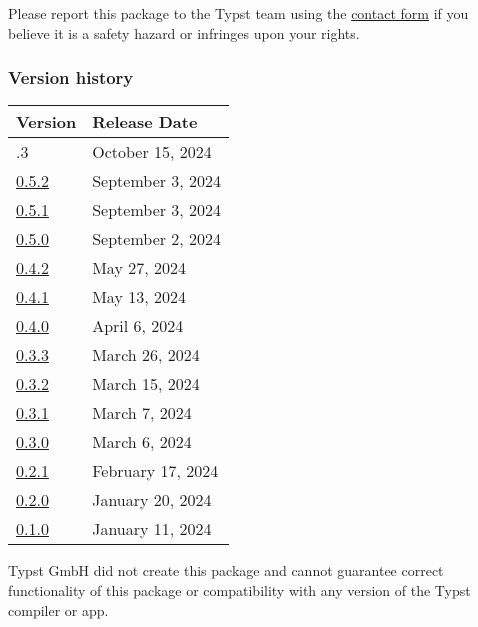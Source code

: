 Please report this package to the Typst team using the
\href{https://typst.app/contact}{contact form} if you believe it is a
safety hazard or infringes upon your rights.

\label{versions}
\subsubsection{Version history}\label{version-history}

\begin{longtable}[]{@{}ll@{}}
\toprule\noalign{}
Version & Release Date \\
\midrule\noalign{}
\endhead
\bottomrule\noalign{}
\endlastfoot
0.5.3 & October 15, 2024 \\
\href{https://typst.app/universe/package/touying/0.5.2/}{0.5.2} &
September 3, 2024 \\
\href{https://typst.app/universe/package/touying/0.5.1/}{0.5.1} &
September 3, 2024 \\
\href{https://typst.app/universe/package/touying/0.5.0/}{0.5.0} &
September 2, 2024 \\
\href{https://typst.app/universe/package/touying/0.4.2/}{0.4.2} & May
27, 2024 \\
\href{https://typst.app/universe/package/touying/0.4.1/}{0.4.1} & May
13, 2024 \\
\href{https://typst.app/universe/package/touying/0.4.0/}{0.4.0} & April
6, 2024 \\
\href{https://typst.app/universe/package/touying/0.3.3/}{0.3.3} & March
26, 2024 \\
\href{https://typst.app/universe/package/touying/0.3.2/}{0.3.2} & March
15, 2024 \\
\href{https://typst.app/universe/package/touying/0.3.1/}{0.3.1} & March
7, 2024 \\
\href{https://typst.app/universe/package/touying/0.3.0/}{0.3.0} & March
6, 2024 \\
\href{https://typst.app/universe/package/touying/0.2.1/}{0.2.1} &
February 17, 2024 \\
\href{https://typst.app/universe/package/touying/0.2.0/}{0.2.0} &
January 20, 2024 \\
\href{https://typst.app/universe/package/touying/0.1.0/}{0.1.0} &
January 11, 2024 \\
\end{longtable}

Typst GmbH did not create this package and cannot guarantee correct
functionality of this package or compatibility with any version of the
Typst compiler or app.


